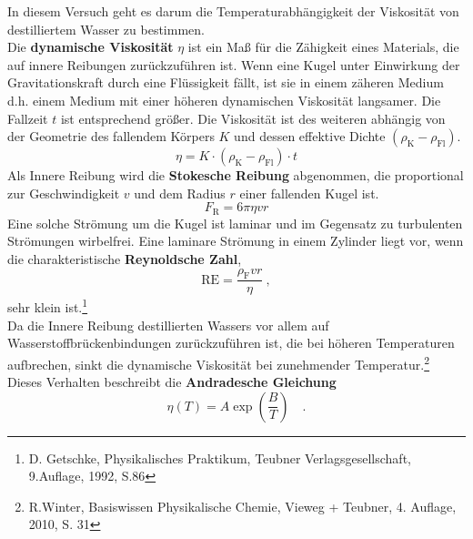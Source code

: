 In diesem Versuch geht es darum die Temperaturabhängigkeit der Viskosität von destilliertem Wasser zu bestimmen. \\
Die \textbf{dynamische Viskosität} $\eta$ ist ein Maß für die Zähigkeit eines Materials, die auf innere Reibungen zurückzuführen ist. Wenn eine Kugel unter Einwirkung der Gravitationskraft durch eine Flüssigkeit fällt, ist sie in einem zäheren Medium d.h. einem Medium mit einer höheren dynamischen Viskosität langsamer. Die Fallzeit $t$ ist entsprechend größer. Die Viskosität ist des weiteren abhängig von der Geometrie des fallendem Körpers $K$ und dessen effektive Dichte $ (\rho_\text{K}-\rho_\text{Fl}) $.
\begin{equation}
\label{Visk}
\eta = K \cdot (\rho_\text{K} - \rho_\text{Fl}) \cdot  t
\end{equation}
Als Innere Reibung wird die \textbf{Stokesche Reibung} abgenommen, die proportional zur Geschwindigkeit $v$ und dem Radius $r$ einer fallenden Kugel ist.
\begin{equation}
F_\text{R} = 6\pi \eta v r
\end{equation}
Eine solche Strömung um die Kugel ist laminar und im Gegensatz zu turbulenten Strömungen wirbelfrei. Eine laminare Strömung in einem Zylinder liegt vor, wenn die charakteristische \textbf{Reynoldsche Zahl},
\begin{equation}
\label{Reynolds}
\text{RE} = \frac{\rho_\text{F} v r}{\eta} \ ,
\end{equation}
sehr klein ist.\footnote{D. Getschke, Physikalisches Praktikum, Teubner Verlagsgesellschaft, 9.Auflage, 1992, S.86} \\
Da die Innere Reibung destillierten Wassers vor allem auf Wasserstoffbrückenbindungen zurückzuführen ist, die bei höheren Temperaturen aufbrechen, sinkt die dynamische Viskosität bei zunehmender Temperatur.\footnote{R.Winter, Basiswissen Physikalische Chemie, Vieweg + Teubner, 4. Auflage, 2010, S. 31} Dieses Verhalten beschreibt die \textbf{Andradesche Gleichung}
\begin{equation}
\label{Andra}
\eta(T) = A \exp \left(\frac{B}{T}\right) \quad.
\end{equation}